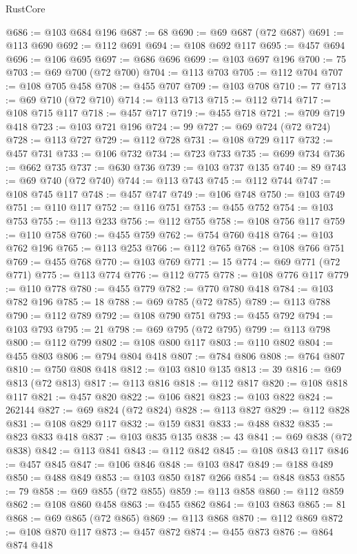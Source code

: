 \begin{lexlean}{RustCore}
\begin{coremodule}
@686 := @103 @684 @196
@687 := 68
@690 := @69 @687 (@72 @687)
@691 := @113 @690
@692 := @112 @691
@694 := @108 @692 @117
@695 := @457 @694
@696 := @106 @695
@697 := @686 @696
@699 := @103 @697 @196
@700 := 75
@703 := @69 @700 (@72 @700)
@704 := @113 @703
@705 := @112 @704
@707 := @108 @705 @458
@708 := @455 @707
@709 := @103 @708
@710 := 77
@713 := @69 @710 (@72 @710)
@714 := @113 @713
@715 := @112 @714
@717 := @108 @715 @117
@718 := @457 @717
@719 := @455 @718
@721 := @709 @719 @418
@723 := @103 @721 @196
@724 := 99
@727 := @69 @724 (@72 @724)
@728 := @113 @727
@729 := @112 @728
@731 := @108 @729 @117
@732 := @457 @731
@733 := @106 @732
@734 := @723 @733
@735 := @699 @734
@736 := @662 @735
@737 := @630 @736
@739 := @103 @737 @135
@740 := 89
@743 := @69 @740 (@72 @740)
@744 := @113 @743
@745 := @112 @744
@747 := @108 @745 @117
@748 := @457 @747
@749 := @106 @748
@750 := @103 @749
@751 := @110 @117
@752 := @116 @751
@753 := @455 @752
@754 := @103 @753
@755 := @113 @233
@756 := @112 @755
@758 := @108 @756 @117
@759 := @110 @758
@760 := @455 @759
@762 := @754 @760 @418
@764 := @103 @762 @196
@765 := @113 @253
@766 := @112 @765
@768 := @108 @766 @751
@769 := @455 @768
@770 := @103 @769
@771 := 15
@774 := @69 @771 (@72 @771)
@775 := @113 @774
@776 := @112 @775
@778 := @108 @776 @117
@779 := @110 @778
@780 := @455 @779
@782 := @770 @780 @418
@784 := @103 @782 @196
@785 := 18
@788 := @69 @785 (@72 @785)
@789 := @113 @788
@790 := @112 @789
@792 := @108 @790 @751
@793 := @455 @792
@794 := @103 @793
@795 := 21
@798 := @69 @795 (@72 @795)
@799 := @113 @798
@800 := @112 @799
@802 := @108 @800 @117
@803 := @110 @802
@804 := @455 @803
@806 := @794 @804 @418
@807 := @784 @806
@808 := @764 @807
@810 := @750 @808 @418
@812 := @103 @810 @135
@813 := 39
@816 := @69 @813 (@72 @813)
@817 := @113 @816
@818 := @112 @817
@820 := @108 @818 @117
@821 := @457 @820
@822 := @106 @821
@823 := @103 @822
@824 := 262144
@827 := @69 @824 (@72 @824)
@828 := @113 @827
@829 := @112 @828
@831 := @108 @829 @117
@832 := @159 @831
@833 := @488 @832
@835 := @823 @833 @418
@837 := @103 @835 @135
@838 := 43
@841 := @69 @838 (@72 @838)
@842 := @113 @841
@843 := @112 @842
@845 := @108 @843 @117
@846 := @457 @845
@847 := @106 @846
@848 := @103 @847
@849 := @188 @489
@850 := @488 @849
@853 := @103 @850 @187 @266
@854 := @848 @853
@855 := 79
@858 := @69 @855 (@72 @855)
@859 := @113 @858
@860 := @112 @859
@862 := @108 @860 @458
@863 := @455 @862
@864 := @103 @863
@865 := 81
@868 := @69 @865 (@72 @865)
@869 := @113 @868
@870 := @112 @869
@872 := @108 @870 @117
@873 := @457 @872
@874 := @455 @873
@876 := @864 @874 @418

\end{coremodule}
\end{lexlean}
